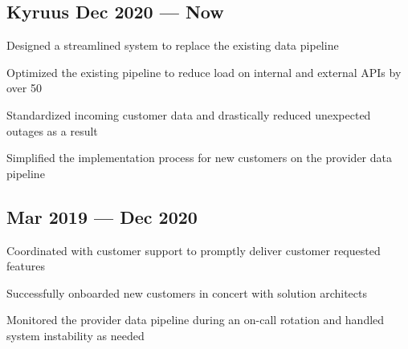 

\subsection{{Kyruus \hfill Dec 2020 --- Now}}
\begin{zitemize}
\item Designed a streamlined system to replace the existing data pipeline
\item Optimized the existing pipeline to reduce load on internal and external APIs by over 50%
\item Standardized incoming customer data and drastically reduced unexpected outages as a result
\item Simplified the implementation process for new customers on the provider data pipeline
\end{zitemize}

\subsection{{\hfill Mar 2019 --- Dec 2020}}
\begin{zitemize}
\item Coordinated with customer support to promptly deliver customer requested features
\item Successfully onboarded new customers in concert with solution architects
\item Monitored the provider data pipeline during an on-call rotation and handled system instability as needed
\end{zitemize}

